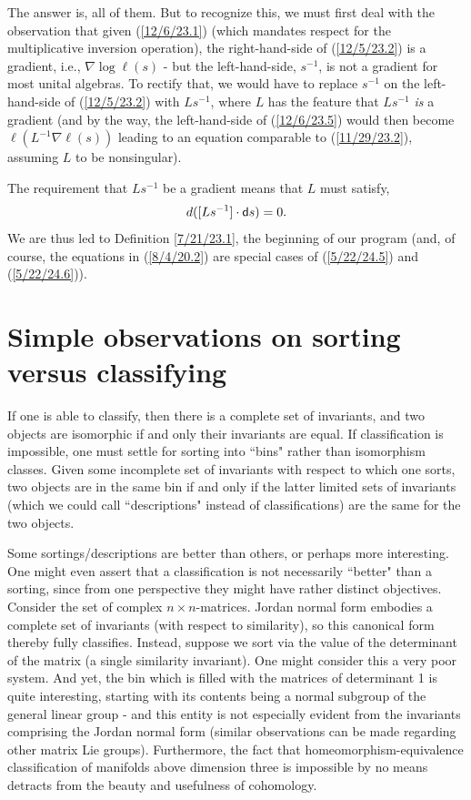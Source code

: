 \documentclass{amsart}
\numberwithin{equation}{section}
\theoremstyle{definition}
\numberwithin{theorem}{section}
\begin{document}
{The answer is, all of them.  But to recognize this, we must first deal with the observation that given (\ref{12/6/23.1}) (which mandates respect for the multiplicative inversion operation), the right-hand-side of (\ref{12/5/23.2}) is a gradient, i.e., $\nabla\log \ell(s)$ - but the left-hand-side, $s^{-1}$, is not a gradient for most unital algebras.  
To rectify that, we would have to replace $s^{-1}$ on the left-hand-side of (\ref{12/5/23.2}) with $Ls^{-1}$, where $L$ has the feature that $Ls^{-1}$ {\it is} a gradient (and by the way, the left-hand-side of (\ref{12/6/23.5}) would then become $\ell(L^{-1}\nabla\ell(s))$ leading to an equation comparable to  (\ref{11/29/23.2}), assuming $L$ to be nonsingular).   


The requirement that $Ls^{-1}$ be a gradient means that $L$ must satisfy, \[ d([Ls^{-1}]\cdot {\sf d}s) = 0.\]  We are thus led to Definition \ref{7/21/23.1}, the beginning of our program (and, of course, the equations in (\ref{8/4/20.2}) are special cases of (\ref{5/22/24.5}) and (\ref{5/22/24.6})).

\vspace{.5cm}

\section{Simple observations on sorting versus classifying} 

If one is able to classify, then there is a complete set of invariants, and two objects are isomorphic if and only their invariants are equal.  If classification is impossible, one must settle for sorting into ``bins" rather than isomorphism classes.  Given some incomplete set of invariants with respect to which one sorts, two objects are in the same bin if and only if the latter limited sets of invariants (which we could call ``descriptions" instead of classifications) are the same for the two objects.  

Some sortings/descriptions are better than others, or perhaps more interesting.  One might even assert that a classification is not necessarily ``better" than a sorting, since from one perspective they might have rather distinct objectives.  Consider the set of complex $n\times n$-matrices.  Jordan normal form embodies a complete set of \mbox{invariants} (with respect to similarity), so this canonical form thereby fully classifies.  Instead, suppose we sort via the value of the determinant of the matrix (a single similarity invariant).  One might consider this a very poor system.  And yet, the bin which is filled with the matrices of determinant 1 is quite interesting, starting with its contents being a normal subgroup of the general linear group - and this entity is not especially evident from the invariants comprising the Jordan normal form (similar observations can be made regarding other matrix Lie groups). Furthermore, the fact that homeomorphism-equivalence classification of manifolds above dimension three is impossible by no means detracts from the beauty and usefulness of cohomology.  


}
\end{document}
